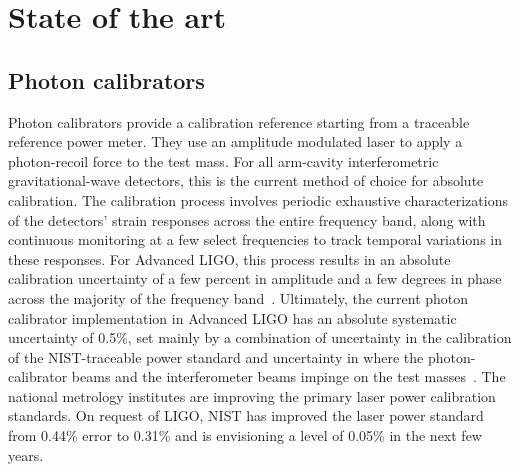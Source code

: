 
\section{State of the art}
\subsection{Photon calibrators}
Photon calibrators provide a calibration reference starting from a traceable reference power meter. They use an amplitude modulated laser to apply a photon-recoil force to the test mass. For all arm-cavity interferometric gravitational-wave detectors, this is the current method of choice for absolute calibration.
The calibration process involves periodic exhaustive characterizations of the detectors' strain responses across the entire frequency band, along with continuous monitoring at a few select frequencies to track temporal variations in these responses.
For Advanced LIGO, this process results in an absolute calibration uncertainty of a few percent in amplitude and a few degrees in phase across the majority of the frequency band~\cite{PhysRevD.96.102001}.
Ultimately, the current photon calibrator implementation in Advanced LIGO has an absolute systematic uncertainty of 0.5\%, set mainly by a combination of uncertainty in the calibration of the NIST-traceable power standard and uncertainty in where the photon-calibrator beams and the interferometer beams impinge on the test masses~\cite{ALIGOPhotCalib2016, NISTWorkshop2019}. The national metrology institutes are improving the primary laser power calibration standards. On request of LIGO, NIST has improved the laser power standard from 0.44\% error to 0.31\% and is envisioning a level of 0.05\% in the next few years.

